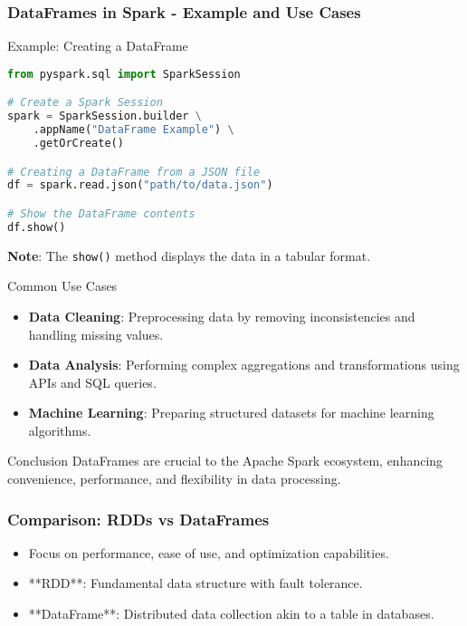 \documentclass[aspectratio=169]{beamer}
\begin{document}
\begin{frame}[fragile]
    \frametitle{DataFrames in Spark - Example and Use Cases}
    \begin{block}{Example: Creating a DataFrame}
        \begin{lstlisting}[language=Python]
from pyspark.sql import SparkSession

# Create a Spark Session
spark = SparkSession.builder \
    .appName("DataFrame Example") \
    .getOrCreate()

# Creating a DataFrame from a JSON file
df = spark.read.json("path/to/data.json")

# Show the DataFrame contents
df.show()
        \end{lstlisting}
        \textbf{Note}: The \texttt{show()} method displays the data in a tabular format.
    \end{block}

    \begin{block}{Common Use Cases}
        \begin{itemize}
            \item \textbf{Data Cleaning}: Preprocessing data by removing inconsistencies and handling missing values.
            \item \textbf{Data Analysis}: Performing complex aggregations and transformations using APIs and SQL queries.
            \item \textbf{Machine Learning}: Preparing structured datasets for machine learning algorithms.
        \end{itemize}
    \end{block}

    \begin{block}{Conclusion}
        DataFrames are crucial to the Apache Spark ecosystem, enhancing convenience, performance, and flexibility in data processing.
    \end{block}
\end{frame}

\begin{frame}
    \frametitle{Comparison: RDDs vs DataFrames}
    \begin{itemize}
        \item Focus on performance, ease of use, and optimization capabilities.
        \item **RDD**: Fundamental data structure with fault tolerance.
        \item **DataFrame**: Distributed data collection akin to a table in databases.
    \end{itemize}
\end{frame}
\end{document}

